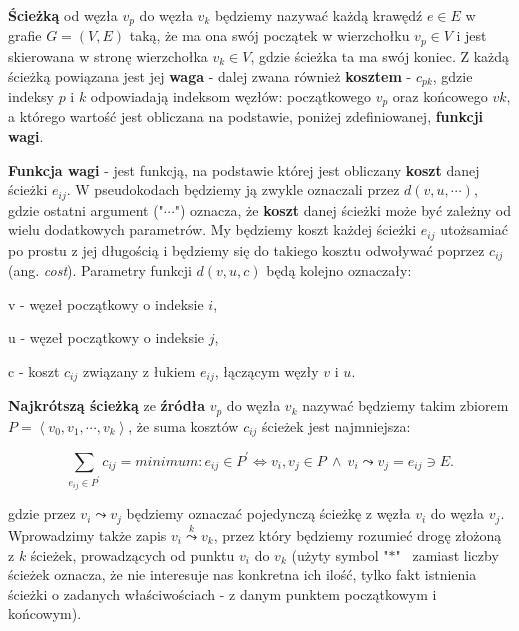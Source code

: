 \begin{myitemize}

\item \textbf{Ścieżką} od węzła $v_{p}$ do węzła $v_{k}$ będziemy nazywać każdą krawędź $e \in E$ w grafie $G = \left( V, E \right)$ taką, że ma ona swój początek w wierzchołku $v_{p} \in V$ i jest skierowana w stronę wierzchołka $v_{k} \in V$, gdzie ścieżka ta ma swój koniec. Z każdą ścieżką powiązana jest jej \textbf{waga} - dalej zwana również \textbf{kosztem} - $c_{pk}$, gdzie indeksy $p$ i $k$ odpowiadają indeksom węzłów: początkowego $v_{p}$ oraz końcowego $v{k}$, a którego wartość jest obliczana na podstawie, poniżej zdefiniowanej, \textbf{funkcji wagi}.

\item \textbf{Funkcja wagi} - jest funkcją, na podstawie której jest obliczany \textbf{koszt} danej ścieżki $e_{ij}$. W pseudokodach będziemy ją zwykle oznaczali przez $ d \left( v, u, \cdots \right) $, gdzie ostatni argument ("$\cdots$") oznacza, że \textbf{koszt} danej ścieżki może być zależny od wielu dodatkowych parametrów. My będziemy koszt każdej ścieżki $e_{ij}$ utożsamiać po prostu z jej długością i będziemy się do takiego kosztu odwoływać poprzez $c_{ij}$ (ang. \textit{cost}). Parametry funkcji $ d \left( v, u, c \right) $ będą kolejno oznaczały:

\begin{myitemize}

\item[v] - węzeł początkowy o indeksie $i$,
\item[u] - węzeł początkowy o indeksie $j$,
\item[c] - koszt $c_{ij}$ związany z łukiem $e_{ij}$, łączącym węzły $v$ i $u$.

\end{myitemize}


\item \textbf{Najkrótszą ścieżką} ze \textbf{źródła} $v_{p}$ do węzła $v_{k}$ nazywać będziemy takim zbiorem $P = \left \langle v_{0}, v_{1}, \cdots, v_{k} \right \rangle $, że suma kosztów $c_{ij}$ ścieżek jest najmniejsza:

\begin{equation}
\sum_{e_{ij} \in P^{'}} c_{ij} = minimum : e_{ij} \in P^{'} \Leftrightarrow v_{i},v_{j} \in P \: \wedge \: v_{i} \leadsto v_{j} = e_{ij} \ni E.
\end{equation}

gdzie przez $v_{i} \leadsto v_{j}$ będziemy oznaczać pojedynczą ścieżkę z węzła $v_{i}$ do węzła $v_{j}$. Wprowadzimy także zapis $v_{i} \overset{k}\leadsto v_{k}$, przez który będziemy rozumieć drogę złożoną z $k$ ścieżek, prowadzących od punktu $v_{i}$ do $v_{k}$ (użyty symbol "$*$"~ zamiast liczby ścieżek oznacza, że nie interesuje nas konkretna ich ilość, tylko fakt istnienia ścieżki o zadanych właściwościach - z danym punktem początkowym i końcowym). 


\end{myitemize}
